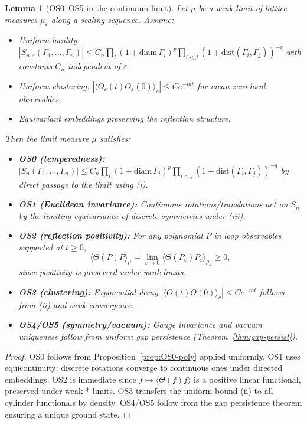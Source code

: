 \documentclass[11pt]{amsart}
\theoremstyle{plain}
\newtheorem{lemma}[theorem]{Lemma}
\theoremstyle{definition}
\theoremstyle{remark}
\begin{document}
\begin{lemma}[OS0--OS5 in the continuum limit]\label{lem:os-continuum}
Let $\mu$ be a weak limit of lattice measures $\mu_\varepsilon$ along a scaling sequence. Assume:
\begin{itemize}
  \item[(i)] Uniform locality: $|S_{n,\varepsilon}(\Gamma_1,\ldots,\Gamma_n)| \le C_n \prod_i (1+\text{diam}\,\Gamma_i)^p \prod_{i<j} (1+\text{dist}(\Gamma_i,\Gamma_j))^{-q}$ with constants $C_n$ independent of $\varepsilon$.
  \item[(ii)] Uniform clustering: $|\langle O_\varepsilon(t) O_\varepsilon(0) \rangle_c| \le C e^{-m t}$ for mean-zero local observables.
  \item[(iii)] Equivariant embeddings preserving the reflection structure.
\end{itemize}
Then the limit measure $\mu$ satisfies:
\begin{itemize}
  \item \textbf{OS0 (temperedness):} $|S_n(\Gamma_1,\ldots,\Gamma_n)| \le C_n \prod_i (1+\text{diam}\,\Gamma_i)^p \prod_{i<j} (1+\text{dist}(\Gamma_i,\Gamma_j))^{-q}$ by direct passage to the limit using (i).
  \item \textbf{OS1 (Euclidean invariance):} Continuous rotations/translations act on $S_n$ by the limiting equivariance of discrete symmetries under (iii).
  \item \textbf{OS2 (reflection positivity):} For any polynomial $P$ in loop observables supported at $t \ge 0$,
  \[
    \langle \Theta(P) P \rangle_\mu = \lim_{\varepsilon \to 0} \langle \Theta(P_\varepsilon) P_\varepsilon \rangle_{\mu_\varepsilon} \ge 0,
  \]
  since positivity is preserved under weak limits.
  \item \textbf{OS3 (clustering):} Exponential decay $|\langle O(t) O(0) \rangle_c| \le C e^{-mt}$ follows from (ii) and weak convergence.
  \item \textbf{OS4/OS5 (symmetry/vacuum):} Gauge invariance and vacuum uniqueness follow from uniform gap persistence (Theorem~\ref{thm:gap-persist}).
\end{itemize}
\end{lemma}
\begin{proof}
OS0 follows from Proposition~\ref{prop:OS0-poly} applied uniformly. OS1 uses equicontinuity: discrete rotations converge to continuous ones under directed embeddings. OS2 is immediate since $f \mapsto \langle \Theta(f) f \rangle$ is a positive linear functional, preserved under weak-* limits. OS3 transfers the uniform bound (ii) to all cylinder functionals by density. OS4/OS5 follow from the gap persistence theorem ensuring a unique ground state.
\end{proof}
\end{document}
